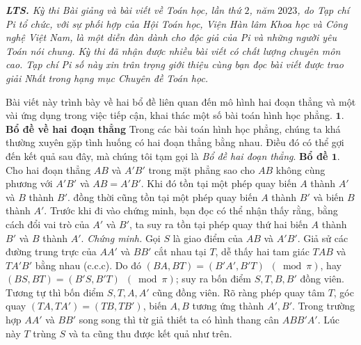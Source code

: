 \textit{\textbf{\color{hoccungpi}LTS.} Kỳ thi Bài giảng và bài viết về Toán học, lần thứ $2$, năm $2023$, do Tạp chí Pi tổ chức, với sự phối hợp của Hội Toán học, Viện Hàn lâm Khoa học và Công nghệ Việt Nam, là một diễn đàn dành cho độc giả của Pi và những người yêu Toán nói chung. Kỳ thi đã nhận được nhiều bài viết có chất lượng chuyên môn cao. Tạp chí Pi số này xin trân trọng giới thiệu cùng bạn đọc bài viết được trao giải Nhất trong hạng mục Chuyên đề Toán học.}
\begin{multicols}{2}
	Bài viết này trình bày về hai bổ đề liên quan đến mô hình hai đoạn thẳng và một vài ứng dụng trong việc tiếp cận, khai thác một số bài toán hình học phẳng.
	\vskip 0.1cm
	\textbf{\color{hoccungpi}$\pmb{1.}$ Bổ đề về hai đoạn thẳng} 
	\vskip 0.1cm
	Trong các bài toán hình học phẳng, chúng ta khá thường xuyên gặp tình huống có hai đoạn thẳng bằng nhau. Điều đó có thể gợi đến kết quả sau đây, mà chúng tôi tạm gọi là \textit{Bổ đề hai đoạn thẳng}.
	\vskip 0.1cm 
	\textbf{\color{hoccungpi}Bổ đề $\pmb{1.}$} Cho hai đoạn thẳng $AB$ và $A'B'$ trong mặt phẳng sao cho $AB$ không cùng phương với $A'B'$ và $AB=A'B'$. Khi đó tồn tại một phép quay biến $A$ thành $A'$ và $B$ thành $B'$. đồng thời cũng tồn tại một phép quay biến $A$ thành $B'$ và biến $B$ thành $A'$.
	\vskip 0.1cm
	Trước khi đi vào chứng minh, bạn đọc có thể nhận thấy rằng, bằng cách đổi vai trò của $A'$ và $B'$, ta suy ra tồn tại phép quay thứ hai biến $A$ thành $B'$ và  $B$ thành $A'$.
	\vskip 0.1cm
	\textit{Chứng minh.} Gọi $S$ là giao điểm của $AB$ và $A'B'$. Giả sử các đường trung trực của $AA'$ và $BB'$ cắt nhau tại $T$, dễ thấy hai tam giác $TAB$ và $TA'B'$ bằng nhau (c.c.c). Do đó $(BA,BT)=(B'A',B'T)\,\,\,(\bmod \pi)$, hay $(BS,BT)=(B'S,B'T)\,\,\,(\bmod \pi)$; suy ra bốn điểm $S,T,B,B'$ đồng viên. Tương tự thì bốn điểm $S,T,A,A'$ cũng đồng viên. Rõ ràng phép quay tâm $T$, góc quay $(TA,TA')=(TB,TB')$, biến  $A,B$ tương ứng thành $A',B'$. Trong trường hợp $AA'$ và $BB'$ song song thì từ giả thiết ta có hình thang cân $ABB'A'$. Lúc này $T$ trùng $S$ và ta cũng thu được kết quả như trên.
	\begin{figure}[H]
		\vspace*{-5pt}
		\centering
		\captionsetup{labelformat= empty, justification=centering}

\end{figure}
\end{multicols}
